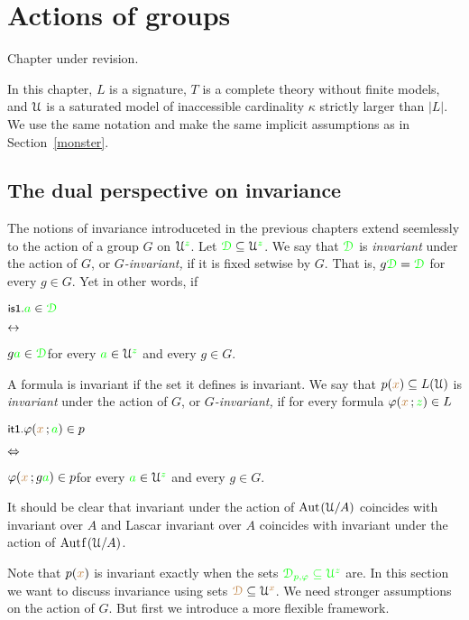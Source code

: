 \chapter{Actions of groups}
\label{actions}

\def\medrel#1{\parbox[t]{5ex}{$\displaystyle\hfil #1$}}
\def\ceq#1#2#3{\parbox[t]{17ex}{$\displaystyle #1$}\medrel{#2}{$\displaystyle #3$}}

Chapter under revision.

In this chapter, $L$ is a signature, $T$ is a complete theory without finite models, and $\EuScript U$ is a saturated model of inaccessible cardinality $\kappa$ strictly larger than $|L|$.
We use the same notation and make the same implicit assumptions as in Section~\ref{monster}.

\section{The dual perspective on invariance}\label{dual_perspective}

The notions of invariance introduceted in the previous chapters extend seemlessly to the action of a group $G$ on $\EuScript U^{\color{green} z}$.
Let ${\color{green}\EuScript D}\subseteq\EuScript U^{\color{green} z}$.
We say that ${\color{green}\EuScript D}$ is \emph{invariant\/} under the action of $G$, or \emph{$G$-invariant,} if it is fixed setwise by $G$.
That is, $g{\color{green}\EuScript D}={\color{green}\EuScript D}$ for every $g\in G$.
Yet in other words, if

\ceq{\ssf{is1.}\hfill {\gr a}\in\grD}{\iff}{g{\gr a}\in\grD}\hfill for every ${\color{green} a}\in\EuScript U^{\color{green} z}$ and every $g\in G$.

A formula is invariant if the set it defines is invariant.
We say that $p({\color{brown} x})\subseteq L(\EuScript U)$ is \emph{invariant\/} under the action of $G$, or \emph{$G$-invariant,} if for every formula $\varphi({\color{brown} x}\,;{\color{green} z})\in L$ 

\ceq{\ssf{it1.}\hfill\phi({\mr x}\,;{\gr a})\in p}{\IFF}{\phi({\mr x}\,;g{\gr a})\in p}\hfill for every ${\color{green} a}\in\EuScript U^{\color{green} z}$ and every $g\in G$.

It should be clear that invariant under the action of ${\rm Aut\kern.15ex}(\EuScript U/A)$ coincides with invariant over $A$ and Lascar invariant over $A$ coincides with invariant under the action of $\mathord{\rm Aut\kern.15ex{f}\kern.15ex}(\EuScript U/A)$.

Note that $p({\color{brown} x})$ is invariant exactly when the sets $\color{green}\EuScript D_{p,\varphi}\subseteq\EuScript U^{\color{green} z}$ are.
In this section we want to discuss invariance using sets ${\color{brown}\EuScript D}\subseteq\EuScript U^{\color{brown} x}$.
We need stronger assumptions on the action of $G$.
But first we introduce a more flexible framework.

